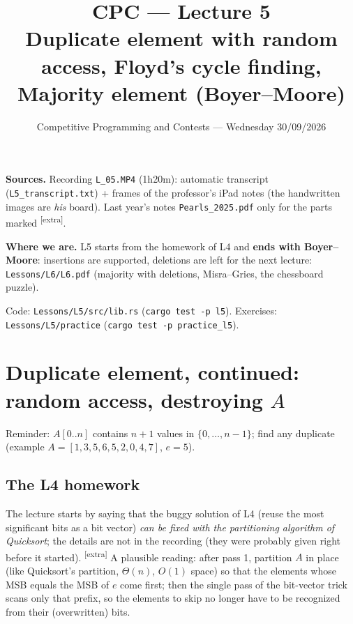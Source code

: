 \documentclass[11pt,a4paper]{article}
\title{\textbf{CPC --- Lecture 5}\\[2pt]\large Duplicate element with random access, Floyd's cycle finding, Majority element (Boyer--Moore)}
\author{Competitive Programming and Contests --- Wednesday 30/09/2026}
\date{}
\theoremstyle{definition}\newtheorem*{definition}{Definition}
\newcommand{\extra}{\textsuperscript{\textcolor{warn}{[extra]}}}
\begin{document}
\maketitle
\vspace{-1.5em}
\begin{keybox}
\textbf{Sources.} Recording \texttt{L\_05.MP4} (1h20m): automatic transcript (\texttt{L5\_transcript.txt}) + frames of the professor's iPad notes
(the handwritten images are \emph{his} board). Last year's notes \texttt{Pearls\_2025.pdf} only for the parts marked \extra{}.

\end{keybox}
\begin{warnbox}
\textbf{Where we are.} L5 starts from the homework of L4 and \textbf{ends with Boyer--Moore}: insertions are supported, deletions are left
for the next lecture: \texttt{Lessons/L6/L6.pdf} (majority with deletions, Misra--Gries, the chessboard puzzle).
\end{warnbox}

\noindent Code: \texttt{Lessons/L5/src/lib.rs} (\texttt{cargo test -p l5}). Exercises: \texttt{Lessons/L5/practice} (\texttt{cargo test -p practice\_l5}).

\tableofcontents

\section{Duplicate element, continued: random access, destroying $A$}
Reminder: $A[0..n]$ contains $n+1$ values in $\{0,\dots,n-1\}$; find any duplicate (example $A=[1,3,5,6,5,2,0,4,7]$, $e=5$).

\subsection{The L4 homework}
The lecture starts by saying that the buggy solution of L4 (reuse the most significant bits as a bit vector) \emph{can be fixed with the partitioning
algorithm of Quicksort}; the details are not in the recording (they were probably given right before it started).
\extra{} A plausible reading: after pass 1, partition $A$ in place (like Quicksort's partition, $\Theta(n)$, $O(1)$ space) so that the elements whose
MSB equals the MSB of $e$ come first; then the single pass of the bit-vector trick scans only that prefix, so the elements to skip no longer have to be
recognized from their (overwritten) bits.
\end{document}
